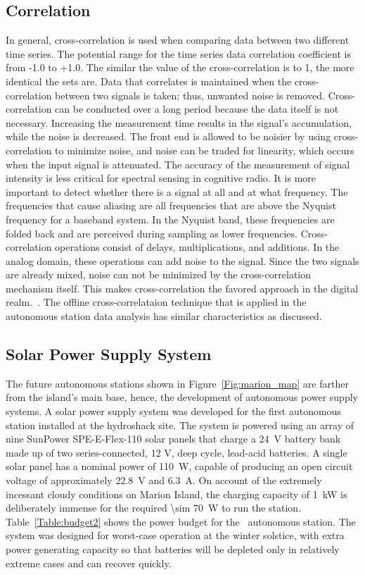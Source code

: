 \subsection{Correlation}

In general, cross-correlation is used when comparing data between two different time series. The potential range for the time series data correlation coefficient is from -1.0 to +1.0. The similar the value of the cross-correlation is to 1, the more identical the sets are. Data that correlates is maintained when the cross-correlation between two signals is taken; thus, unwanted noise is removed. Cross-correlation can be conducted over a long period because the data itself is not necessary. Increasing the measurement time results in the signal's accumulation, while the noise is decreased. The front end is allowed to be noisier by using cross-correlation to minimize noise, and noise can be traded for linearity, which occurs when the input signal is attenuated. The accuracy of the measurement of signal intensity is less critical for spectral sensing in cognitive radio. It is more important to detect whether there is a signal at all and at what frequency. The frequencies that cause aliasing are all frequencies that are above the Nyquist frequency for a baseband system. In the Nyquist band, these frequencies are folded back and are perceived during sampling as lower frequencies. Cross-correlation operations consist of delays, multiplications, and additions. In the analog domain, these operations can add noise to the signal. Since the two signals are already mixed, noise can not be minimized by the cross-correlation mechanism itself. This makes cross-correlation the favored approach in the digital realm.~\citep{essay61335}. The offline cross-correlataion technique that is applied in the autonomous station data analysis has similar characteristics as discussed.

\subsection{Solar Power Supply System}

The future autonomous stations shown in Figure~\ref{Fig:marion_map} are farther from the island's main base, hence, the development of autonomous power supply systems. A solar power supply system was developed for the first autonomous station installed at the hydroshack site. The system is powered using an array of nine SunPower SPE-E-Flex-110 solar panels that charge a \SI{24}{\volt} battery bank made up of two series-connected, 12 V, deep cycle, lead-acid batteries. A single solar panel has a nominal power of \SI{110}{\watt}, capable of producing an open circuit voltage of approximately \SI{22.8}{\volt} and \SI{6.3}{\ampere}. On account of the extremely incessant cloudy conditions on Marion Island, the charging capacity of \SI{1}{\kilo\watt} is deliberately immense for the required \SI{\sim 70}{\watt} to run the station. Table~\ref{Table:budget2} shows the power budget for the \albatros\ autonomous station. The system was designed for worst-case operation at the winter solstice, with extra power generating capacity so that batteries will be depleted only in relatively extreme cases and can recover quickly. 


